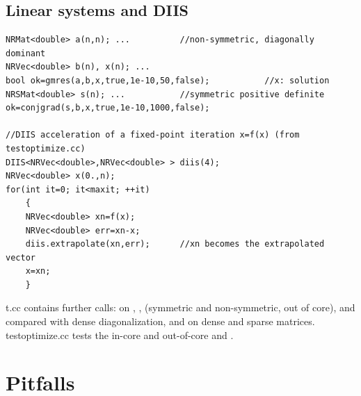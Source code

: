 \subsection{Linear systems and DIIS}

\begin{lstlisting}
NRMat<double> a(n,n); ...          //non-symmetric, diagonally dominant
NRVec<double> b(n), x(n); ...
bool ok=gmres(a,b,x,true,1e-10,50,false);           //x: solution
NRSMat<double> s(n); ...           //symmetric positive definite
ok=conjgrad(s,b,x,true,1e-10,1000,false);

//DIIS acceleration of a fixed-point iteration x=f(x) (from testoptimize.cc)
DIIS<NRVec<double>,NRVec<double> > diis(4);
NRVec<double> x(0.,n);
for(int it=0; it<maxit; ++it)
	{
	NRVec<double> xn=f(x);
	NRVec<double> err=xn-x;
	diis.extrapolate(xn,err);      //xn becomes the extrapolated vector
	x=xn;
	}
\end{lstlisting}

t.cc contains further calls:  on , ,  (symmetric and non-symmetric,
out of core),  and  compared with dense diagonalization, and  on dense and sparse
matrices. testoptimize.cc tests the in-core and out-of-core  and .

\section{Pitfalls}\label{sec:iterative:pitfalls}

